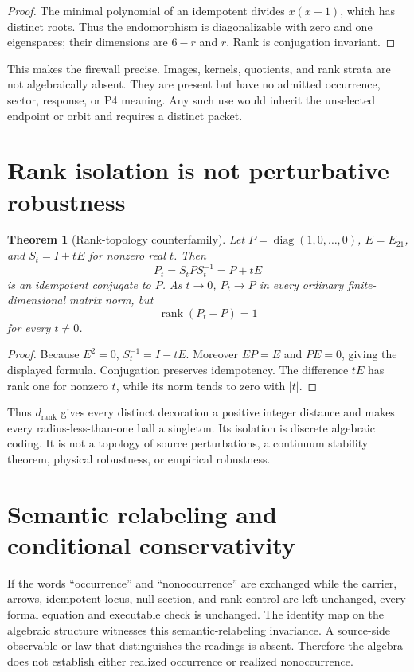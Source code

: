 \documentclass[11pt]{article}
\newtheorem{theorem}{Theorem}
\begin{document}
\begin{proof}
The minimal polynomial of an idempotent divides $x(x-1)$, which has distinct
roots. Thus the endomorphism is diagonalizable with zero and one eigenspaces;
their dimensions are $6-r$ and $r$. Rank is conjugation invariant.
\end{proof}

This makes the firewall precise. Images, kernels, quotients, and rank strata
are not algebraically absent. They are present but have no admitted occurrence,
sector, response, or P4 meaning. Any such use would inherit the unselected
endpoint or orbit and requires a distinct packet.

\section{Rank isolation is not perturbative robustness}

\begin{theorem}[Rank-topology counterfamily]
Let $P=\operatorname{diag}(1,0,\ldots,0)$,
$E=E_{21}$, and $S_t=I+tE$ for nonzero real $t$. Then
\[
 P_t=S_tPS_t^{-1}=P+tE
\]
is an idempotent conjugate to $P$. As $t\to0$, $P_t\to P$ in every ordinary
finite-dimensional matrix norm, but
\[
 \operatorname{rank}(P_t-P)=1
\]
for every $t\ne0$.
\end{theorem}

\begin{proof}
Because $E^2=0$, $S_t^{-1}=I-tE$. Moreover $EP=E$ and $PE=0$, giving the
displayed formula. Conjugation preserves idempotency. The difference $tE$ has
rank one for nonzero $t$, while its norm tends to zero with $|t|$.
\end{proof}

Thus $d_{\mathrm{rank}}$ gives every distinct decoration a positive integer
distance and makes every radius-less-than-one ball a singleton. Its isolation
is discrete algebraic coding. It is not a topology of source perturbations, a
continuum stability theorem, physical robustness, or empirical robustness.

\section{Semantic relabeling and conditional conservativity}

If the words ``occurrence'' and ``nonoccurrence'' are exchanged while the
carrier, arrows, idempotent locus, null section, and rank control are left
unchanged, every formal equation and executable check is unchanged. The
identity map on the algebraic structure witnesses this semantic-relabeling
invariance. A source-side observable or law that distinguishes the readings is
absent. Therefore the algebra does not establish either realized occurrence or
realized nonoccurrence.
\end{document}
